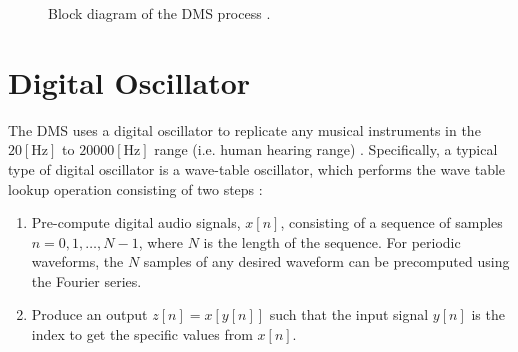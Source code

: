 \documentclass[12pt]{article}
\begin{document}
\begin{figure}[h!]
    \begin{center}
    \end{center}
    \caption{Block diagram of the DMS process \cite{SO}.}
    \label{fig:process}
\end{figure}

\section{Digital Oscillator}
The DMS uses a digital oscillator to replicate any musical instruments in the $20 [\text{Hz}]$ to $20000 [\text{Hz}]$ range (i.e. human hearing range) \cite{SS}. Specifically, a typical type of digital oscillator is a wave-table oscillator, which performs the wave table lookup operation consisting of two steps \cite{TTEM}:
\begin{enumerate}
    \item Pre-compute digital audio signals, $x[n]$, consisting of a sequence of samples $n=0,1,\ldots,N-1$, where $N$ is the length of the sequence. For periodic waveforms, the $N$ samples of any desired waveform can be precomputed using the Fourier series.
    \item Produce an output $z[n]=x[y[n]]$ such that the input signal $y[n]$ is the index to get the specific values from $x[n]$.
\end{enumerate}
\end{document}
